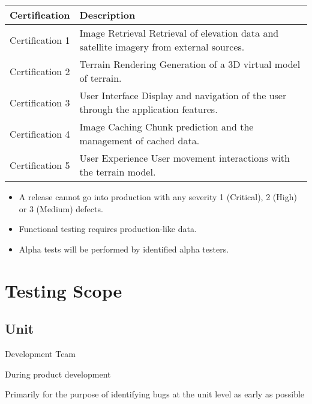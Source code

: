 \documentclass[letterpaper,10pt,english,openany,oneside]{sphinxmanual}
\begin{document}
\begin{savenotes}\sphinxattablestart
\centering
\begin{tabulary}{\linewidth}[t]{|T|T|}
\hline
\sphinxstyletheadfamily 
Certification
&\sphinxstyletheadfamily 
Description
\\
\hline
Certification 1
&
Image Retrieval
Retrieval of elevation data and satellite imagery from external sources.
\\
\hline
Certification 2
&
Terrain Rendering
Generation of a 3D virtual model of terrain.
\\
\hline
Certification 3
&
User Interface
Display and navigation of the user through the application features.
\\
\hline
Certification 4
&
Image Caching
Chunk prediction and the management of cached data.
\\
\hline
Certification 5
&
User Experience
User movement interactions with the terrain model.
\\
\hline
\end{tabulary}
\par
\sphinxattableend\end{savenotes}
\begin{itemize}
\item {} 
A release cannot go into production with any severity 1 (Critical), 2 (High) or 3 (Medium) defects.

\item {} 
Functional testing requires production-like data.

\item {} 
Alpha tests will be performed by identified alpha testers.

\end{itemize}


\section{Testing Scope}
\label{\detokenize{test_plan/strategy:testing-scope}}

\subsection{Unit}
\label{\detokenize{test_plan/strategy:unit}}
 Development Team

 During product development

 Primarily for the purpose of identifying bugs at the unit level as early as possible
\end{document}
